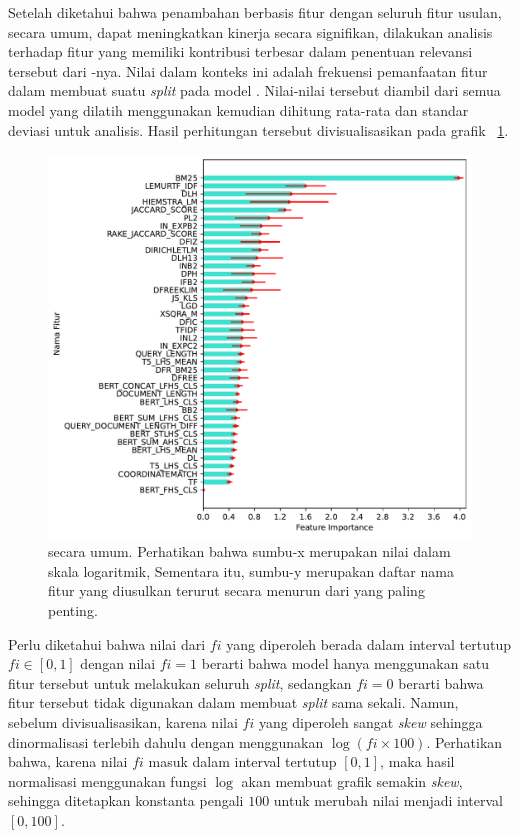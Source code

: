 Setelah diketahui bahwa penambahan \reranker{} berbasis fitur dengan seluruh fitur usulan, secara umum, dapat meningkatkan kinerja secara signifikan, dilakukan analisis terhadap fitur yang memiliki kontribusi terbesar dalam penentuan relevansi tersebut dari \feature{} \importance{}-nya. Nilai \feature{} \importance{} dalam konteks ini adalah frekuensi pemanfaatan fitur dalam membuat suatu \textit{split} pada model \lambdamart{}. Nilai-nilai tersebut diambil dari semua model \lambdamart{} yang dilatih menggunakan \fcv{} kemudian dihitung rata-rata dan standar deviasi untuk analisis. Hasil perhitungan tersebut divisualisasikan pada grafik \gambar{}~\ref{grafik:Feature Importance All}.
\begin{figure}[!ht]
    \centering
    \includegraphics[scale=0.725]{assets/pdfs/Feature Importance Distribution Log.pdf}
    \caption{\feature{} \importance{} secara umum. Perhatikan bahwa sumbu-x merupakan nilai \feature{} \importance{} dalam skala logaritmik, Sementara itu, sumbu-y merupakan daftar nama fitur yang diusulkan terurut secara menurun dari yang paling penting.}
    \label{grafik:Feature Importance All}
\end{figure}
Perlu diketahui bahwa nilai dari \feature{} \importance{} $fi$ yang diperoleh berada dalam interval tertutup $fi\in[0,1]$ dengan nilai $fi=1$ berarti bahwa model hanya menggunakan satu fitur tersebut untuk melakukan seluruh \textit{split}, sedangkan $fi=0$ berarti bahwa fitur tersebut tidak digunakan dalam membuat \textit{split} sama sekali. Namun, sebelum divisualisasikan, karena nilai $fi$ yang diperoleh sangat \textit{skew} sehingga dinormalisasi terlebih dahulu dengan menggunakan $\log(fi \times 100)$. Perhatikan bahwa, karena nilai $fi$ masuk dalam interval tertutup $[0,1]$, maka hasil normalisasi menggunakan fungsi $\log$ akan membuat grafik semakin \textit{skew}, sehingga ditetapkan konstanta pengali $100$ untuk merubah nilai menjadi interval $[0,100]$.


